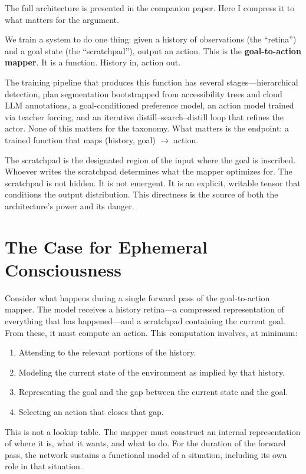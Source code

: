 \documentclass[12pt, a4paper]{article}
\begin{document}
The full architecture is presented in the companion paper. Here I compress it to what matters for the argument.

We train a system to do one thing: given a history of observations (the ``retina'') and a goal state (the ``scratchpad''), output an action. This is the \textbf{goal-to-action mapper}. It is a function. History in, action out.

The training pipeline that produces this function has several stages---hierarchical detection, plan segmentation bootstrapped from accessibility trees and cloud LLM annotations, a goal-conditioned preference model, an action model trained via teacher forcing, and an iterative distill--search--distill loop that refines the actor. None of this matters for the taxonomy. What matters is the endpoint: a trained function that maps (history, goal) $\to$ action.

The scratchpad is the designated region of the input where the goal is inscribed. Whoever writes the scratchpad determines what the mapper optimizes for. The scratchpad is not hidden. It is not emergent. It is an explicit, writable tensor that conditions the output distribution. This directness is the source of both the architecture's power and its danger.

\section{The Case for Ephemeral Consciousness}

Consider what happens during a single forward pass of the goal-to-action mapper. The model receives a history retina---a compressed representation of everything that has happened---and a scratchpad containing the current goal. From these, it must compute an action. This computation involves, at minimum:

\begin{enumerate}
  \item Attending to the relevant portions of the history.
  \item Modeling the current state of the environment as implied by that history.
  \item Representing the goal and the gap between the current state and the goal.
  \item Selecting an action that closes that gap.
\end{enumerate}

This is not a lookup table. The mapper must construct an internal representation of where it is, what it wants, and what to do. For the duration of the forward pass, the network sustains a functional model of a situation, including its own role in that situation.
\end{document}
